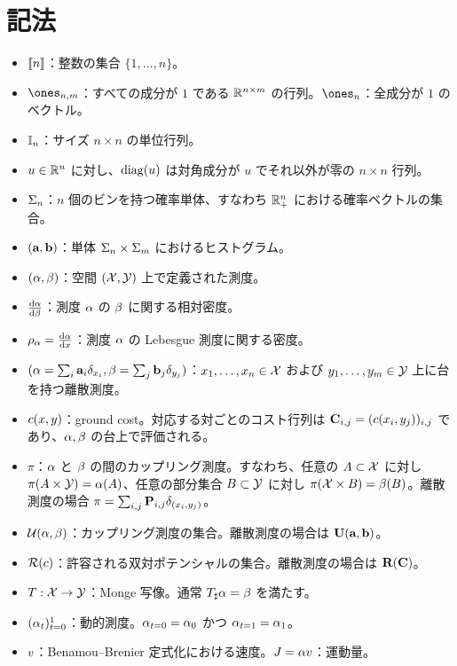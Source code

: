 \section*{記法}

\begin{itemize}
	\item $\range{n}$：整数の集合 $\{1,\dots,n\}$。
	\item $\ones_{n,m}$：すべての成分が $1$ である $\RR^{n\times m}$ の行列。$\ones_{n}$：全成分が $1$ のベクトル。
	\item $\Identity_n$：サイズ $n\times n$ の単位行列。
	\item $u\in\RR^n$ に対し、$\diag(u)$ は対角成分が $u$ でそれ以外が零の $n\times n$ 行列。
	\item $\simplex_n$：$n$ 個のビンを持つ確率単体、すなわち $\RR^n_+$ における確率ベクトルの集合。
	\item $(\a,\b)$：単体 $\simplex_n \times \simplex_m$ におけるヒストグラム。
	\item $(\al,\be)$：空間 $(\X,\Y)$ 上で定義された測度。
	\item $\frac{\d\al}{\d\be}$：測度 $\al$ の $\be$ に関する相対密度。
	\item $\density{\al} = \frac{\d\al}{\d x}$：測度 $\al$ の Lebesgue 測度に関する密度。
	\item $(\al=\sum_i \a_i \delta_{x_i},\be=\sum_j \b_j \delta_{y_j})$：$x_1,\dots,x_n\in\X$ および $y_1,\dots,y_m\in\Y$ 上に台を持つ離散測度。
	\item $\c(x,y)$：ground cost。対応する対ごとのコスト行列は $\C_{i,j}=(\c(x_i,y_j))_{i,j}$ であり、$\al,\be$ の台上で評価される。
	\item $\pi$：$\al$ と $\be$ の間のカップリング測度。すなわち、任意の $A\subset\X$ に対し $\pi(A\times \Y)= \al(A)$、任意の部分集合 $B\subset \Y$ に対し $\pi(\X\times B)= \be(B)$。離散測度の場合 $\pi = \sum_{i,j} \P_{i,j}\delta_{(x_i,y_j)}$。
	\item $\Couplings(\al,\be)$：カップリング測度の集合。離散測度の場合は $\CouplingsD(\a,\b)$。
	\item $\Potentials(\c)$：許容される双対ポテンシャルの集合。離散測度の場合は $\PotentialsD(\C)$。
	\item $\T : \X \rightarrow \Y$：Monge 写像。通常 $\T_\sharp \al = \be$ を満たす。
	\item $(\al_t)_{t=0}^1$：動的測度。$\al_{t=0}=\al_0$ かつ $\al_{t=1}=\al_1$。
	\item $\speed$：Benamou--Brenier 定式化における速度。$\Moment=\al \speed$：運動量。

\end{itemize}
